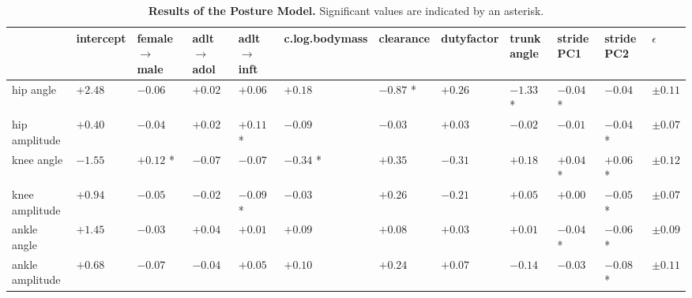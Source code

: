 \begin{landscape}
\begin{table}[htbp]
\caption{\label{tab:postureresults}\textbf{Results of the Posture Model.} Significant values are indicated by an asterisk.}
\centering
\scriptsize
\begin{tabular}{llllllllllll}
 & intercept & female \(\rightarrow\) male & adlt \(\rightarrow\) adol & adlt \(\rightarrow\) inft & c.log.bodymass & clearance & dutyfactor & trunk angle & stride PC1 & stride PC2 & \(\epsilon\)\\[0pt]
\hline
hip angle & \(+2.48\) & \(-0.06\) & \(+0.02\) & \(+0.06\) & \(+0.18\) & \(-0.87\) * & \(+0.26\) & \(-1.33\) * & \(-0.04\) * & \(-0.04\) & \(\pm 0.11\)\\[0pt]
hip amplitude & \(+0.40\) & \(-0.04\) & \(+0.02\) & \(+0.11\) * & \(-0.09\) & \(-0.03\) & \(+0.03\) & \(-0.02\) & \(-0.01\) & \(-0.04\) * & \(\pm 0.07\)\\[0pt]
knee angle & \(-1.55\) & \(+0.12\) * & \(-0.07\) & \(-0.07\) & \(-0.34\) * & \(+0.35\) & \(-0.31\) & \(+0.18\) & \(+0.04\) * & \(+0.06\) * & \(\pm 0.12\)\\[0pt]
knee amplitude & \(+0.94\) & \(-0.05\) & \(-0.02\) & \(-0.09\) * & \(-0.03\) & \(+0.26\) & \(-0.21\) & \(+0.05\) & \(+0.00\) & \(-0.05\) * & \(\pm 0.07\)\\[0pt]
ankle angle & \(+1.45\) & \(-0.03\) & \(+0.04\) & \(+0.01\) & \(+0.09\) & \(+0.08\) & \(+0.03\) & \(+0.01\) & \(-0.04\) * & \(-0.06\) * & \(\pm 0.09\)\\[0pt]
ankle amplitude & \(+0.68\) & \(-0.07\) & \(-0.04\) & \(+0.05\) & \(+0.10\) & \(+0.24\) & \(+0.07\) & \(-0.14\) & \(-0.03\) & \(-0.08\) * & \(\pm 0.11\)\\[0pt]
\end{tabular}
\end{table}


\end{landscape}
